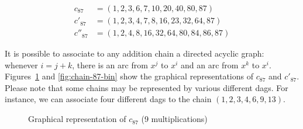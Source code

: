 \begin{align}
c_{87} &= (1,2,3,6,7,10,20,40,80,87) \\
c'_{87}&=(1,2,3,4,7,8,16,23,32,64,87) \\
c''_{87}&=(1,2,4,8,16,32,64,80,84,86,87)
\end{align}

It is possible to associate to any addition chain a directed acyclic graph:
whenever $i=j+k$, there is an arc from $x^j$ to $x^i$ and an arc
from $x^k$ to $x^i$. Figures~\ref{fig:chain-87-eucl}  and 
\ref{fig:chain-87-bin} show the graphical representations of 
 $c_{87}$  and $c'_{87}$. 
Please note that some chains may be represented by various different dags.
For instance, we can associate four different dags to the chain $(1,2,3,4,6,9,13)$. 


\begin{figure}[h]
  \centering
  
  \caption{Graphical representation of $c_{87}$ (9 multiplications)}
  \label{fig:chain-87-eucl}
\end{figure}

